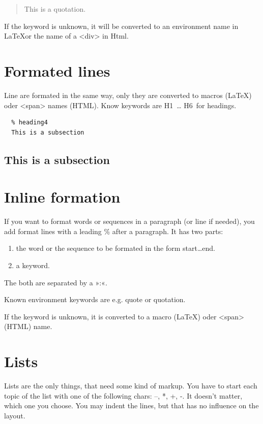\documentclass{article}
\begin{document}
\begin{quote}
This is a quotation.

\end{quote}

If the keyword is unknown, it will be converted to an environment
name in \LaTeX or the name of a <div> in Html.

\section{Formated lines}

Line are formated in the same way, only they are converted
to macros (\LaTeX) oder <span> names (HTML). Know keywords
are H1~… H6~for headings.

\begin{verbatim}
  % heading4
  This is a subsection

\end{verbatim}

\subsection{This is a subsection}

\section{Inline formation}

If you want to format words or sequences in a paragraph (or
line if needed), you add format lines with a leading \% after
a paragraph. It has two parts:

\begin{enumerate}
\item the word or the sequence to be formated in the form
  start…end. 
\item a keyword.

\end{enumerate}

The both are separated by a »:«.

Known environment keywords are e.g. quote or quotation.

If the keyword is unknown, it is converted to a macro
(\LaTeX) oder <span> (HTML) name.

\section{Lists}

Lists are the only things, that need some kind of
markup. You have to start each topic of the list with one of
the following chars: –, *, +, -. It doesn't matter, which one you
choose. You may indent the lines, but that has no influence
on the layout.
\end{document}
